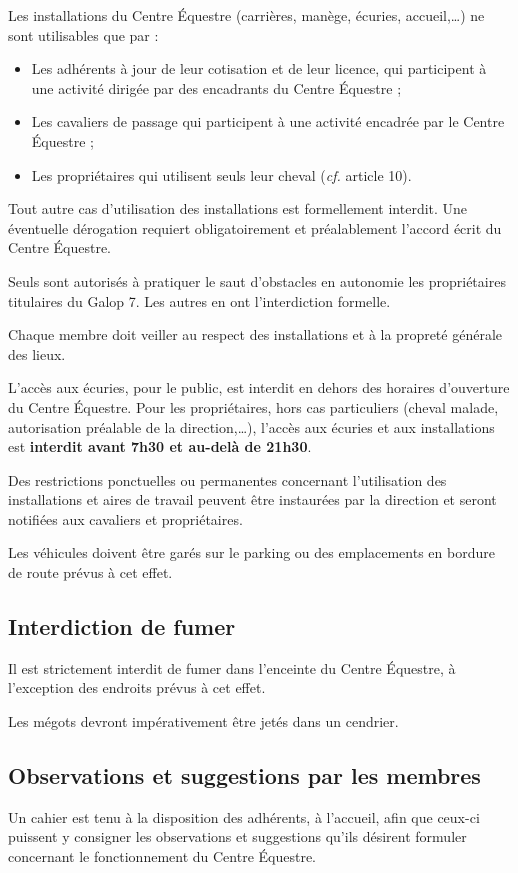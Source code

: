 \documentclass[11pt,a4paper]{article}
\begin{document}
Les installations du Centre Équestre (carrières, manège, écuries, accueil,\dots) ne sont utilisables que par :
\begin{itemize}[leftmargin=50pt]
\item
Les adhérents à jour de leur cotisation et de leur licence, qui participent à une activité dirigée par des encadrants du Centre Équestre ;
\item
Les cavaliers \og de passage \fg{} qui participent à une activité encadrée par le Centre Équestre ;
\item
Les propriétaires qui utilisent seuls leur cheval (\textit{cf.} article 10).
\end{itemize}

Tout autre cas d'utilisation des installations est formellement interdit.
Une éventuelle dérogation requiert obligatoirement et préalablement l'accord écrit du Centre Équestre.

Seuls sont autorisés à pratiquer le saut d'obstacles en autonomie les propriétaires titulaires du Galop 7.
Les autres en ont l'interdiction formelle.

Chaque membre doit veiller au respect des installations et à la propreté générale des lieux.

L'accès aux écuries, pour le public, est interdit en dehors des horaires d'ouverture du Centre Équestre.
Pour les propriétaires, hors cas particuliers (cheval malade, autorisation préalable de la direction,\dots), l'accès aux écuries et aux installations est \textbf{interdit avant 7h30 et au-delà de 21h30}.

Des restrictions ponctuelles ou permanentes concernant l'utilisation des installations et aires de travail peuvent être instaurées par la direction et seront notifiées aux cavaliers et propriétaires.

Les véhicules doivent être garés sur le parking ou des emplacements en bordure de route prévus à cet effet.

\subsection{Interdiction de fumer}\label{subsec:interdiction-de-fumer}
Il est strictement interdit de fumer dans l'enceinte du Centre Équestre, à l'exception des endroits prévus à cet effet.

Les mégots devront impérativement être jetés dans un cendrier.

\subsection{Observations et suggestions par les membres}\label{subsec:observations-et-suggestions-par-les-membres}
Un cahier est tenu à la disposition des adhérents, à l'accueil, afin que ceux-ci puissent y consigner les observations et suggestions qu'ils désirent formuler concernant le fonctionnement du Centre Équestre.
\end{document}
